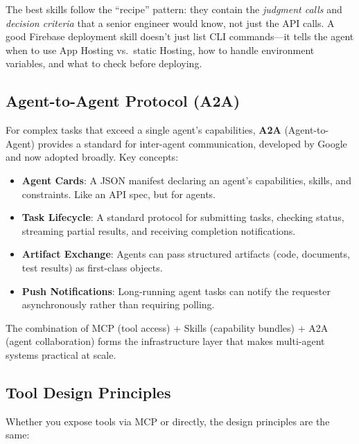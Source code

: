 \begin{tipbox}
The best skills follow the ``recipe'' pattern: they contain the \emph{judgment calls} and \emph{decision criteria} that a senior engineer would know, not just the API calls. A good Firebase deployment skill doesn't just list CLI commands---it tells the agent when to use App Hosting vs.\ static Hosting, how to handle environment variables, and what to check before deploying.
\end{tipbox}

\subsection{Agent-to-Agent Protocol (A2A)}

For complex tasks that exceed a single agent's capabilities, \textbf{A2A} (Agent-to-Agent) provides a standard for inter-agent communication, developed by Google and now adopted broadly. Key concepts:

\begin{itemize}[leftmargin=*]
    \item \textbf{Agent Cards}: A JSON manifest declaring an agent's capabilities, skills, and constraints. Like an API spec, but for agents.
    \item \textbf{Task Lifecycle}: A standard protocol for submitting tasks, checking status, streaming partial results, and receiving completion notifications.
    \item \textbf{Artifact Exchange}: Agents can pass structured artifacts (code, documents, test results) as first-class objects.
    \item \textbf{Push Notifications}: Long-running agent tasks can notify the requester asynchronously rather than requiring polling.
\end{itemize}

The combination of MCP (tool access) + Skills (capability bundles) + A2A (agent collaboration) forms the infrastructure layer that makes multi-agent systems practical at scale.


\subsection{Tool Design Principles}

Whether you expose tools via MCP or directly, the design principles are the same:

